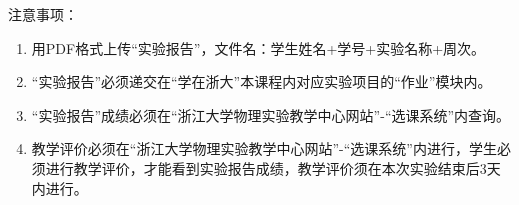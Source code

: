 {\fangsong 注意事项：
\begin{enumerate}[label=\arabic*.]
	\item 用PDF格式上传“实验报告”，文件名：学生姓名+学号+实验名称+周次。
	\item “实验报告”必须递交在“学在浙大”本课程内对应实验项目的“作业”模块内。
	\item “实验报告”成绩必须在“浙江大学物理实验教学中心网站”-“选课系统”内查询。
	\item 教学评价必须在“浙江大学物理实验教学中心网站”-“选课系统”内进行，学生必须进行教学评价，才能看到实验报告成绩，教学评价须在本次实验结束后3天内进行。
\end{enumerate}}
\begin{center}
\end{center}
